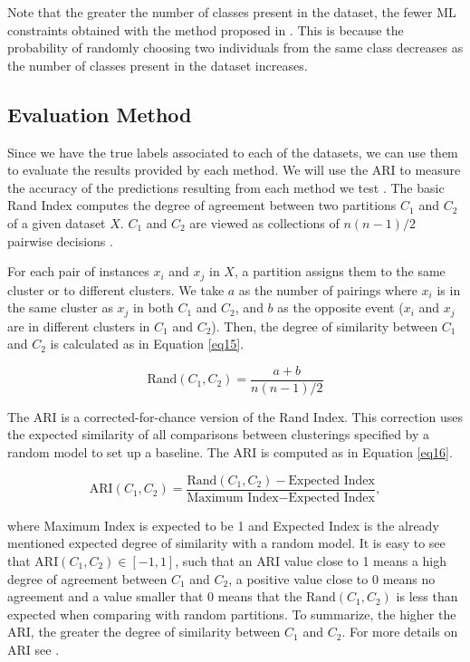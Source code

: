 Note that the greater the number of classes present in the dataset, the fewer ML constraints obtained with the method proposed in \cite{wagstaff2001constrained}. This is because the probability of randomly choosing two individuals from the same class decreases as the number of classes present in the dataset increases.

\subsection{Evaluation Method} \label{sec:EvalMet}

Since we have the true labels associated to each of the datasets, we can use them to evaluate the results provided by each method. We will use the \acf{ARI} to measure the accuracy of the predictions resulting from each method we test \cite{hubert1985comparing}. The basic Rand Index computes the degree of agreement between two partitions $C_1$ and $C_2$ of a given dataset $X$. $C_1$ and $C_2$ are viewed as collections of $n(n - 1)/2$ pairwise decisions \cite{rand1971objective}.

For each pair of instances $x_i$ and $x_j$ in $X$, a partition assigns them to the same cluster or to different clusters. We take $a$ as the number of pairings where $x_i$ is in the same cluster as $x_j$ in both $C_1$ and $C_2$, and $b$ as the opposite event ($x_i$ and $x_j$ are in different clusters in $C_1$ and $C_2$). Then, the degree of similarity between $C_1$ and $C_2$ is calculated as in Equation \eqref{eq15}.

\begin{equation}
\text{Rand}(C_1, C_2) = \frac{a + b}{n(n - 1)/2}
\label{eq15}
\end{equation}

The \acs{ARI} is a corrected-for-chance version of the Rand Index. This correction uses the expected similarity of all comparisons between clusterings specified by a random model to set up a baseline. The \acs{ARI} is computed as in Equation \eqref{eq16}.

\begin{equation}
\text{ARI}(C_1, C_2) = \frac{\text{Rand}(C_1, C_2) - \text{Expected Index}}{\text{Maximum Index} - \text{Expected Index}},
\label{eq16}
\end{equation}

\noindent where Maximum Index is expected to be 1 and Expected Index is the already mentioned expected degree of similarity with a random model. It is easy to see that $\text{ARI}(C_1, C_2) \in [-1,1]$, such that an \acs{ARI} value close to 1 means a high degree of agreement between $C_1$ and $C_2$, a positive value close to 0 means no agreement and a value smaller that 0 means that the $\text{Rand}(C_1, C_2)$ is less than expected when comparing with random partitions. To summarize, the higher the \acs{ARI}, the greater the degree of similarity between $C_1$ and $C_2$. For more details on \acs{ARI} see \cite{hubert1985comparing}.


